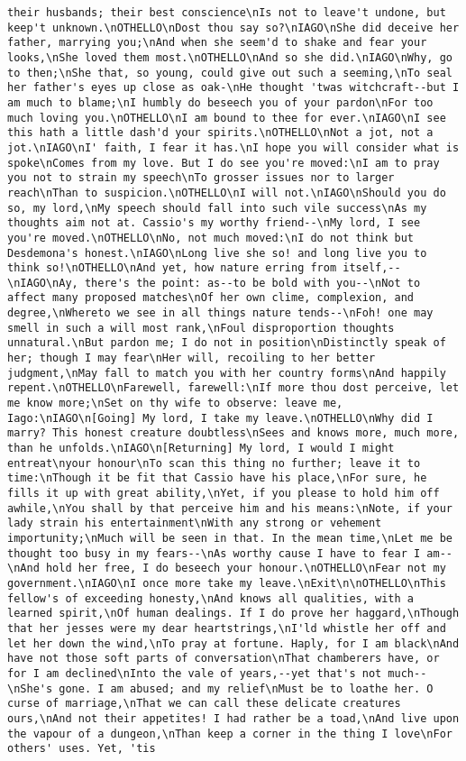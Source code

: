 \begin{verbatim}
their husbands; their best conscience\nIs not to leave't undone, but keep't unknown.\nOTHELLO\nDost thou say so?\nIAGO\nShe did deceive her father, marrying you;\nAnd when she seem'd to shake and fear your looks,\nShe loved them most.\nOTHELLO\nAnd so she did.\nIAGO\nWhy, go to then;\nShe that, so young, could give out such a seeming,\nTo seal her father's eyes up close as oak-\nHe thought 'twas witchcraft--but I am much to blame;\nI humbly do beseech you of your pardon\nFor too much loving you.\nOTHELLO\nI am bound to thee for ever.\nIAGO\nI see this hath a little dash'd your spirits.\nOTHELLO\nNot a jot, not a jot.\nIAGO\nI' faith, I fear it has.\nI hope you will consider what is spoke\nComes from my love. But I do see you're moved:\nI am to pray you not to strain my speech\nTo grosser issues nor to larger reach\nThan to suspicion.\nOTHELLO\nI will not.\nIAGO\nShould you do so, my lord,\nMy speech should fall into such vile success\nAs my thoughts aim not at. Cassio's my worthy friend--\nMy lord, I see you're moved.\nOTHELLO\nNo, not much moved:\nI do not think but Desdemona's honest.\nIAGO\nLong live she so! and long live you to think so!\nOTHELLO\nAnd yet, how nature erring from itself,--\nIAGO\nAy, there's the point: as--to be bold with you--\nNot to affect many proposed matches\nOf her own clime, complexion, and degree,\nWhereto we see in all things nature tends--\nFoh! one may smell in such a will most rank,\nFoul disproportion thoughts unnatural.\nBut pardon me; I do not in position\nDistinctly speak of her; though I may fear\nHer will, recoiling to her better judgment,\nMay fall to match you with her country forms\nAnd happily repent.\nOTHELLO\nFarewell, farewell:\nIf more thou dost perceive, let me know more;\nSet on thy wife to observe: leave me, Iago:\nIAGO\n[Going] My lord, I take my leave.\nOTHELLO\nWhy did I marry? This honest creature doubtless\nSees and knows more, much more, than he unfolds.\nIAGO\n[Returning] My lord, I would I might entreat\nyour honour\nTo scan this thing no further; leave it to time:\nThough it be fit that Cassio have his place,\nFor sure, he fills it up with great ability,\nYet, if you please to hold him off awhile,\nYou shall by that perceive him and his means:\nNote, if your lady strain his entertainment\nWith any strong or vehement importunity;\nMuch will be seen in that. In the mean time,\nLet me be thought too busy in my fears--\nAs worthy cause I have to fear I am--\nAnd hold her free, I do beseech your honour.\nOTHELLO\nFear not my government.\nIAGO\nI once more take my leave.\nExit\n\nOTHELLO\nThis fellow's of exceeding honesty,\nAnd knows all qualities, with a learned spirit,\nOf human dealings. If I do prove her haggard,\nThough that her jesses were my dear heartstrings,\nI'ld whistle her off and let her down the wind,\nTo pray at fortune. Haply, for I am black\nAnd have not those soft parts of conversation\nThat chamberers have, or for I am declined\nInto the vale of years,--yet that's not much--\nShe's gone. I am abused; and my relief\nMust be to loathe her. O curse of marriage,\nThat we can call these delicate creatures ours,\nAnd not their appetites! I had rather be a toad,\nAnd live upon the vapour of a dungeon,\nThan keep a corner in the thing I love\nFor others' uses. Yet, 'tis 
\end{verbatim}
